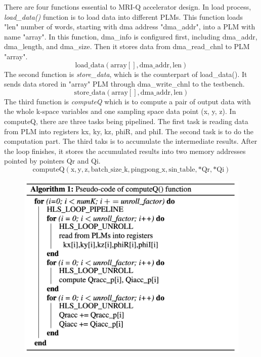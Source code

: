 There are four functions essential to MRI-Q accelerator design. In load process,
\textit{load\_data()} function is to load data into different PLMs. This
function loads "len" number of words, starting with dma address "dma\_addr",
into a PLM with name "array". In this function, dma\_info is configured first,
including dma\_addr, dma\_length, and dma\_size. Then it stores data from
dma\_read\_chnl to PLM "array".
%
$$\mathrm{load\_data(array[], dma\_addr, len)}$$
%
The second function is \textit{store\_data}, which is the counterpart of
load\_data(). It sends data stored in "array" PLM through dma\_write\_chnl to
the testbench.
%
$$\mathrm{store\_data(array[], dma\_addr, len)}$$
%
The third function is \textit{computeQ} which is to compute a pair of output
data with the whole k-space variables and one sampling space data point (x, y,
z). In computeQ, there are three tasks being pipelined. The first task is
reading data from PLM into registers kx, ky, kz, phiR, and phiI. The second task
is to do the computation part. The third taks is to accumulate the intermediate
results. After the loop finishes, it stores the accumulated results into two
memory addresses pointed by pointers Qr and Qi.
%
$$\mathrm{computeQ(x, y, z, batch\_size\_k, pingpong\_x, sin\_table, *Qr, *Qi)}$$

\begin{figure}[t]
\centering
\captionsetup{justification=centering, format=hang}
\includegraphics[width=\columnwidth]{figure/computeQAlgorithm.png}
\label{fig-data-convert}
\end{figure}

